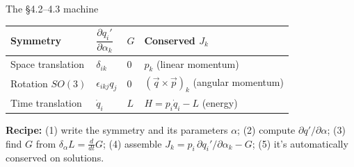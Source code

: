 \documentclass[11pt]{article}
\begin{document}
\begin{keybox}{The \S4.2--4.3 machine}
\renewcommand{\arraystretch}{1.4}
\begin{center}
\begin{tabular}{@{}llll@{}}
\textbf{Symmetry} & $\dfrac{\partial q_i'}{\partial\alpha_k}$ & $G$ & \textbf{Conserved $J_k$}\\[4pt]
\hline
Space translation & $\delta_{ik}$ & $0$ & $p_k$ \;(linear momentum)\\
Rotation $SO(3)$   & $\epsilon_{ikj}q_j$ & $0$ & $(\vec q\times\vec p)_k$ \;(angular momentum)\\
Time translation   & $\dot q_i$ & $L$ & $H=p_i\dot q_i-L$ \;(energy)\\
\hline
\end{tabular}
\end{center}
\smallskip
\textbf{Recipe:} (1) write the symmetry and its parameters $\alpha$; (2) compute
$\partial q'/\partial\alpha$; (3) find $G$ from $\delta_\alpha L=\frac{d}{dt}G$;
(4) assemble $J_k=p_i\,\partial q_i'/\partial\alpha_k-G$; (5) it's automatically
conserved on solutions.
\end{keybox}
\end{document}
